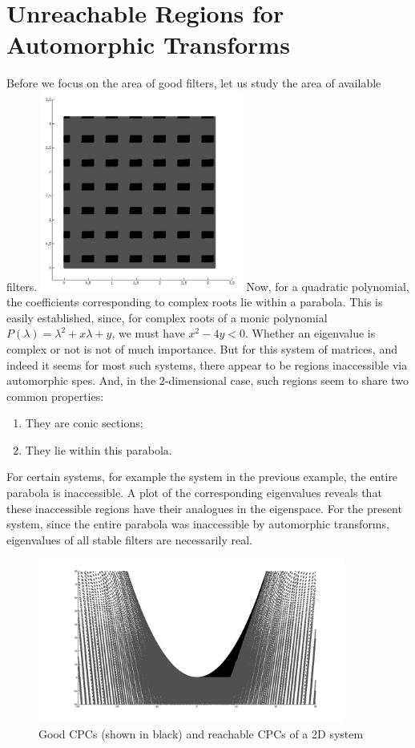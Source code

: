 \section{Unreachable Regions for Automorphic Transforms}
\begin{multicols}{2}
\label{sec:un}
Before we focus on the area of good filters, let us study the area of 
available filters.
\includegraphics[width=0.5\textwidth]{Sources/Images/theta_s_in_uns.jpg}
Now, for a quadratic polynomial, the coefficients corresponding to
complex roots lie within a parabola. This is easily established, 
since, for complex roots of a monic polynomial 
$P(\lambda) = \lambda^2 + x\lambda + y$, we must have
$x^2 - 4y < 0$. Whether an eigenvalue is complex or not is not of
much importance. But for this system of matrices, and indeed it seems for
most such systems, there appear to be regions inaccessible via 
automorphic \glspl{spe}. And, in the 2-dimensional case, such 
regions seem to share two common properties: 
\begin{enumerate}
\item They are conic sections;
\item They lie within this parabola.
\end{enumerate}
For certain systems, for example the system in the previous example,
the entire parabola is inaccessible. A plot of the corresponding
eigenvalues reveals that these inaccessible regions have their 
analogues in the eigenspace. For the present system, since the entire
parabola was inaccessible by automorphic transforms, eigenvalues of all
stable filters are necessarily real.
\begin{figure}
\centering
\includegraphics[width=0.9\textwidth]{Sources/Images/s_in_uns.jpg}
\caption{Good CPCs (shown in black) and reachable CPCs of a 2D system}
\label{fig:s_vs_us}
\end{figure}


\end{multicols}
